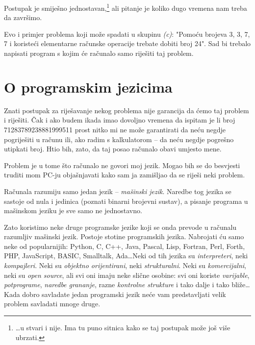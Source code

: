 	Postupak je smije\v{s}no jednostavan,\footnote{\dots u stvari i nije. Ima tu puno sitnica kako se taj postupak mo\v{z}e
	jo\v{s} vi\v{s}e ubrzati.}
	ali pitanje je koliko dugo vremena nam treba
	da zavr\v{s}imo. 

	Evo i primjer problema koji mo\v{z}e spadati u skupinu \emph{(c)}: "Pomo\'{c}u
	brojeva 3, 3, 7, 7 i koriste\'{c}i elementarne ra\v{c}unske operacije trebate
	dobiti broj 24". Sad bi trebalo napisati program s kojim \'{c}e ra\v{c}unalo samo
	rije\v{s}iti taj problem.

\section{O programskim jezicima}

	Znati postupak za rije\v{s}avanje nekog problema nije garancija da \'{c}emo taj
	problem i rije\v{s}iti. 
	\v{C}ak i ako budem ikada imao dovoljno vremena da ispitam je li broj
	71283789238881999511 
	prost nitko mi ne mo\v{z}e garantirati da ne\'{c}u negdje
	pogrije\v{s}iti u ra\v{c}unu ili, ako radim s kalkulatorom -- da ne\'{c}u negdje
	pogre\v{s}no utipkati broj.
	Htio bih, zato, da taj posao ra\v{c}unalo obavi umjesto mene.
	
	Problem je u tome \v{s}to ra\v{c}unalo ne govori moj jezik. 
	Mogao bih se do besvjesti truditi mom PC-ju obja\v{s}njavati kako sam ja 
	zami\v{s}ljao da se rije\v{s}i neki problem. 

	Ra\v{c}unala razumiju samo jedan jezik -- \emph{ma\v{s}inski jezik}. Naredbe tog
	jezika se sastoje od nula i jedinica (poznati binarni brojevni sustav), a pisanje
	programa u ma\v{s}inskom jeziku je sve samo ne jednostavno.

	Zato koristimo neke druge programske jezike koji se onda prevode u 
	ra\v{c}unalu razumljiv ma\v{s}inski jezik. 
	Postoje stotine programskih jezika. Nabrojati
	\'{c}u samo neke od popularnijih: Python, C, C++, Java, Pascal, Lisp, Fortran, 
	Perl, Forth, PHP, JavaScript, BASIC, Smalltalk, Ada\dots Neki od tih jezika su
	\emph{interpreteri}, neki \emph{kompajleri}. Neki su \emph{objektno orijentirani},
	neki \emph{strukturalni}. Neki su \emph{komercijalni}, neki su \emph{open source},
	ali svi oni imaju neke sli\v{c}ne osobine: svi oni koriste \emph{varijable},
	\emph{potprograme}, \emph{naredbe grananje}, razne \emph{kontrolne strukture} i
	tako dalje i tako bli\v{z}e\dots Kada dobro savladate jedan programski
	jezik ne\'{c}e vam predstavljati velik problem savladati mnoge druge.

